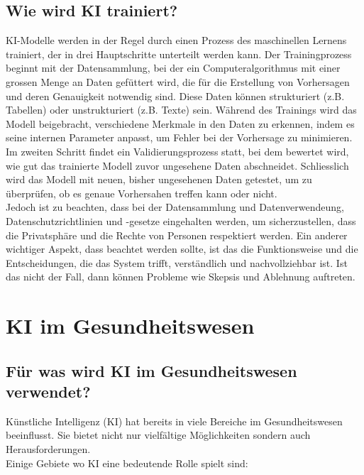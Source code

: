 \documentclass{report}
\begin{document}
\newpage
\section {Wie wird KI trainiert?}

KI-Modelle werden in der Regel durch einen Prozess des maschinellen Lernens trainiert, 
der in drei Hauptschritte unterteilt werden kann. Der Trainingprozess beginnt mit der Datensammlung, 
bei der ein Computeralgorithmus mit einer grossen Menge an Daten gefüttert wird, die für die Erstellung 
von Vorhersagen und deren Genauigkeit notwendig sind. Diese Daten können strukturiert (z.B. Tabellen) oder 
unstrukturiert (z.B. Texte) sein. Während des Trainings wird das Modell beigebracht, verschiedene Merkmale 
in den Daten zu erkennen, indem es seine internen Parameter anpasst, um Fehler bei der Vorhersage 
zu minimieren. \\ Im zweiten Schritt findet ein Validierungsprozess statt, bei dem bewertet wird, wie gut 
das trainierte Modell zuvor ungesehene Daten abschneidet. Schliesslich wird das Modell mit neuen, bisher 
ungesehenen Daten getestet, um zu überprüfen, ob es genaue Vorhersahen treffen kann oder nicht. 
\citep{clickworker}
\\
Jedoch ist zu beachten, dass bei der Datensammlung und Datenverwendeung, Datenschutzrichtlinien und -gesetze 
eingehalten werden, um sicherzustellen, dass die Privatsphäre und die Rechte von Personen respektiert 
werden. Ein anderer wichtiger Aspekt, dass beachtet werden sollte, ist das die Funktionsweise und die 
Entscheidungen, die das System trifft, verständlich und nachvollziehbar ist. Ist das nicht der Fall, 
dann können Probleme wie Skepsis und Ablehnung auftreten. 


\chapter{KI im Gesundheitswesen}


\section{Für was wird KI im Gesundheitswesen verwendet?}

Künstliche Intelligenz (KI) hat bereits in viele Bereiche im Gesundheitswesen beeinflusst. Sie bietet nicht nur 
vielfältige Möglichkeiten sondern auch Herausforderungen.\\ Einige Gebiete wo KI eine bedeutende Rolle spielt sind:
\end{document}
